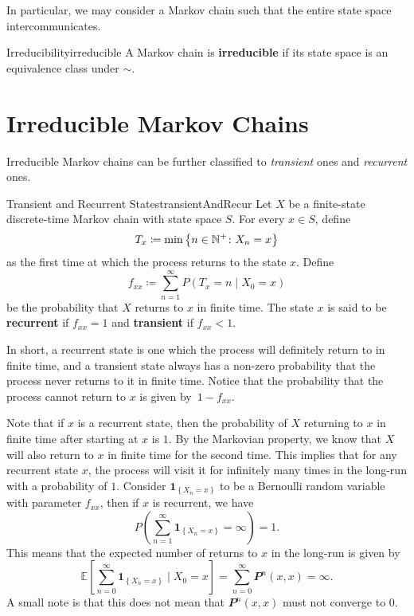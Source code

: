 \documentclass[math, code]{amznotes}
\theoremstyle{remark}
\begin{document}
In particular, we may consider a Markov chain such that the entire state space intercommunicates.
\begin{dfnbox}{Irreducibility}{irreducible}
    A Markov chain is {\color{red} \textbf{irreducible}} if its state space is an equivalence class under $\sim$.
\end{dfnbox}
\section{Irreducible Markov Chains}
Irreducible Markov chains can be further classified to \textit{transient} ones and \textit{recurrent} ones.
\begin{dfnbox}{Transient and Recurrent States}{transientAndRecur}
    Let $X$ be a finite-state discrete-time Markov chain with state space $S$. For every $x \in S$, define 
    \begin{equation*}
        T_x \coloneqq \min\left\{n \in \mathbb{N}^+ \colon X_n = x\right\}
    \end{equation*}
    as the first time at which the process returns to the state $x$. Define 
    \begin{equation*}
        f_{xx} \coloneqq \sum_{n = 1}^{\infty}P\left(T_x = n \mid X_0 = x\right)
    \end{equation*}
    be the probability that $X$ returns to $x$ in finite time. The state $x$ is said to be {\color{red} \textbf{recurrent}} if $f_{xx} = 1$ and {\color{red} \textbf{transient}} if $f_{xx} < 1$.
\end{dfnbox}
In short, a recurrent state is one which the process will definitely return to in finite time, and a transient state always has a non-zero probability that the process never returns to it in finite time. Notice that the probability that the process cannot return to $x$ is given by~$1 - f_{xx}$.

Note that if $x$ is a recurrent state, then the probability of $X$ returning to $x$ in finite time after starting at $x$ is $1$. By the Markovian property, we know that $X$ will also return to $x$ in finite time for the second time. This implies that for any recurrent state $x$, the process will visit it for infinitely many times in the long-run with a probability of $1$. Consider $\mathbf{1}_{\left\{X_n = x\right\}}$ to be a Bernoulli random variable with parameter $f_{xx}$, then if $x$ is recurrent, we have 
\begin{equation*}
    P\left(\sum_{n = 1}^{\infty}\mathbf{1}_{\left\{X_n = x\right\}} = \infty\right) = 1.
\end{equation*}
This means that the expected number of returns to $x$ in the long-run is given by
\begin{equation*}
    \mathbb{E}\left[\sum_{n = 0}^{\infty}\mathbf{1}_{\left\{X_n = x\right\}} \mid X_0 = x\right] = \sum_{n = 0}^{\infty}\mathbfit{P}^n\left(x, x\right) = \infty.
\end{equation*}
A small note is that this does not mean that $\mathbfit{P}^n\left(x, x\right)$ must not converge to $0$.
\end{document}
